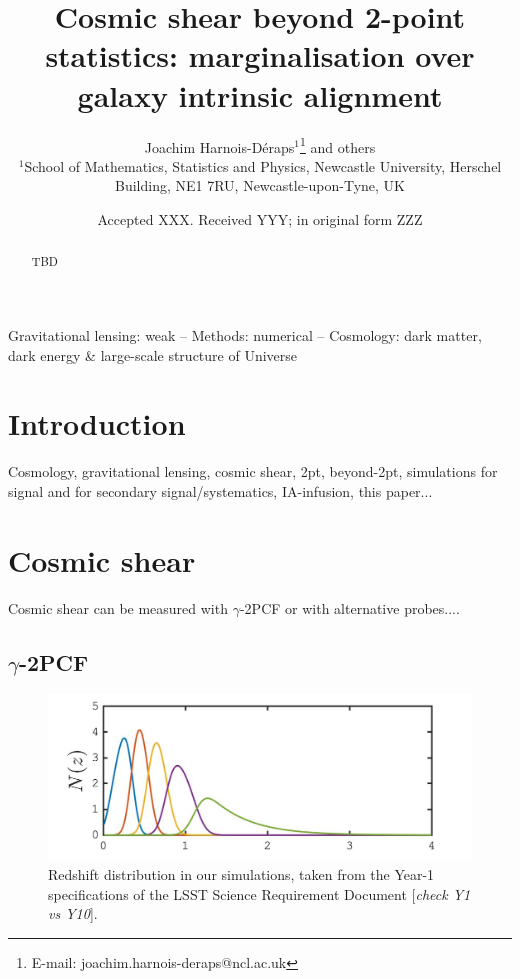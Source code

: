 \documentclass[useAMS,usenatbib]{mn2e}
\title[Lensing beyond 2pt: accounting for IA]{Cosmic shear beyond 2-point statistics: marginalisation over galaxy intrinsic alignment}
\author[J. Harnois-D\'{e}raps et al.]{Joachim Harnois-D\'{e}raps$^{1}$\thanks{E-mail: joachim.harnois-deraps@ncl.ac.uk} and others
\\
$^{1}$School of Mathematics, Statistics and Physics, Newcastle University, Herschel Building, NE1 7RU, Newcastle-upon-Tyne, UK\\
}
\date{Accepted XXX. Received YYY; in original form ZZZ}
\begin{document}
\label{firstpage}
\maketitle

\begin{abstract}
TBD
\end{abstract}

\begin{keywords}
Gravitational lensing: weak -- Methods: numerical -- Cosmology: dark matter, dark energy \& large-scale structure of Universe 
\end{keywords}



  
\section{Introduction}
\label{sec:intro}

Cosmology, gravitational lensing, cosmic shear, 2pt, beyond-2pt, simulations for signal and for secondary signal/systematics, IA-infusion, this paper... 

\section{Cosmic shear}
\label{sec:theory}

Cosmic shear can be measured with $\gamma$-2PCF or with alternative probes....

\subsection{$\gamma$-2PCF}
\label{subsec:wl-th}


\begin{figure}
\includegraphics[width=\columnwidth]{graphs/Nz}
\caption{Redshift distribution in our simulations, taken from the Year-1 specifications of the LSST Science Requirement Document \citep{LSST-SRD} {[\it check Y1 vs Y10}].}
\label{fig:Nz}
\end{figure}
\end{document}
